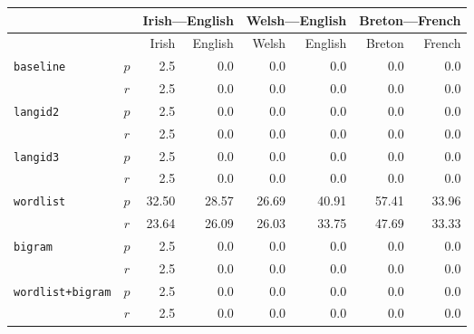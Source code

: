 \documentclass[11pt]{article}
\begin{document}
\begin{table}
\begin{center}
\begin{tabular}{|lc|rr|rr|rr|}
\hline
            & & \multicolumn{2}{c}{Irish---English} & \multicolumn{2}{c}{Welsh---English} & \multicolumn{2}{c}{Breton---French}  \\
\hline
                                        &         &  Irish &       English & Welsh & English & Breton & French \\
\multirow{2}{*}{\texttt{baseline}} &  $p$ &  2.5 & 0.0        & 0.0 & 0.0 & 0.0 & 0.0 \\
                                       & $r$  & 2.5   & 0.0       & 0.0 & 0.0 & 0.0 & 0.0 \\
\hline
\multirow{2}{*}{\texttt{langid2}} &  $p$ &  2.5 & 0.0        & 0.0 & 0.0 & 0.0 & 0.0 \\
                                       & $r$  & 2.5   & 0.0       & 0.0 & 0.0 & 0.0 & 0.0 \\
\hline
\multirow{2}{*}{\texttt{langid3}} &  $p$ &  2.5 & 0.0        & 0.0 & 0.0 & 0.0 & 0.0 \\
                                       & $r$  & 2.5   & 0.0       & 0.0 & 0.0 & 0.0 & 0.0 \\
\hline
\multirow{2}{*}{\texttt{wordlist}} &  $p$ &  32.50 & 28.57        & 26.69 & 40.91 & 57.41 & 33.96 \\
                                       & $r$  & 23.64   & 26.09       & 26.03 & 33.75 & 47.69 & 33.33 \\
\hline
\multirow{2}{*}{\texttt{bigram}} &  $p$ &  2.5 & 0.0        & 0.0 & 0.0 & 0.0 & 0.0 \\
                                       & $r$  & 2.5   & 0.0       & 0.0 & 0.0 & 0.0 & 0.0 \\
\hline
\multirow{2}{*}{\texttt{wordlist+bigram}} &  $p$ &  2.5 & 0.0        & 0.0 & 0.0 & 0.0 & 0.0 \\
                                       & $r$  & 2.5   & 0.0       & 0.0 & 0.0 & 0.0 & 0.0 \\
\hline
\end{tabular}
\end{center}

\end{table}
\end{document}
